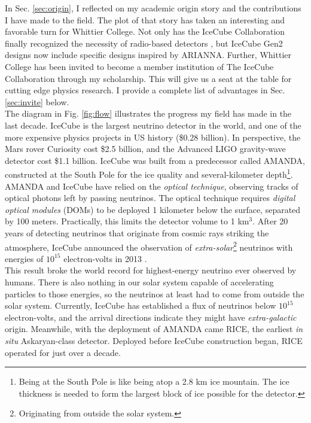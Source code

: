 \documentclass[../../../main.tex]{subfiles}
\begin{document}
In Sec. \ref{sec:origin}, I reflected on my academic origin story and the contributions I have made to the field.  The plot of that story has taken an interesting and favorable turn for Whittier College.  Not only has the IceCube Collaboration finally recognized the necessity of radio-based detectors \cite{PhysRevD.98.062003}, but IceCube Gen2 designs now include specific designs inspired by ARIANNA.  Further, Whittier College has been invited to become a member institution of The IceCube Collaboration through my scholarship.  This will give us a seat at the table for cutting edge physics research.  I provide a complete list of advantages in Sec. \ref{sec:invite} below.
\\
\vspace{0.25cm}
The diagram in Fig. \ref{fig:flow} illustrates the progress my field has made in the last decade.  IceCube is the largest neutrino detector in the world, and one of the more expensive physics projects in US history (\$0.28 billion).  In perspective, the Mars rover Curiosity cost \$2.5 billion, and the Advanced LIGO gravity-wave detector cost \$1.1 billion.  IceCube was built from a predecessor called AMANDA, constructed at the South Pole for the ice quality and several-kilometer depth\footnote{Being at the South Pole is like being atop a 2.8 km ice mountain.  The ice thickness is needed to form the largest block of ice possible for the detector.}.  AMANDA and IceCube have relied on the \textit{optical technique}, observing tracks of optical photons left by passing neutrinos.  The optical technique requires \textit{digital optical modules} (DOMs) to be deployed 1 kilometer below the surface, separated by 100 meters.  Practically, this limits the detector volume to 1 km$^3$.  After 20 years of detecting neutrinos that originate from cosmic rays striking the atmosphere, IceCube announced the observation of \textit{extra-solar}\footnote{Originating from outside the solar system.} neutrinos with energies of $10^{15}$ electron-volts in 2013 \cite{PhysRevLett.111.021103}.
\\
\vspace{0.25cm}
This result broke the world record for highest-energy neutrino ever observed by humans.  There is also nothing in our solar system capable of accelerating particles to those energies, so the neutrinos at least had to come from outside the solar system.  Currently, IceCube has established a flux of neutrinos below $10^{15}$ electron-volts, and the arrival directions indicate they might have \textit{extra-galactic} origin.  Meanwhile, with the deployment of AMANDA came RICE, the earliest \textit{in situ} Askaryan-class detector.  Deployed before IceCube construction began, RICE operated for just over a decade.
\end{document}
